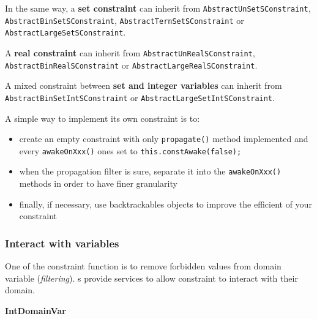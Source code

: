 In the same way, a \textbf{set constraint} can inherit from \texttt{AbstractUnSetSConstraint}, \texttt{AbstractBinSetSConstraint}, \texttt{AbstractTernSetSConstraint} or \texttt{AbstractLargeSetSConstraint}.

A \textbf{real constraint} can inherit from \texttt{AbstractUnRealSConstraint}, \texttt{AbstractBinRealSConstraint} or \texttt{AbstractLargeRealSConstraint}.

A mixed constraint between \textbf{set and integer variables} can inherit from \texttt{AbstractBinSetIntSConstraint} or \texttt{AbstractLargeSetIntSConstraint}.

\begin{note}
A simple way to implement its own constraint is to:
\begin{itemize}
	\item create an empty constraint with only \texttt{propagate()} method implemented and every \texttt{awakeOnXxx()} ones set to \texttt{this.constAwake(false);}
	\item when the propagation filter is sure, separate it into the \texttt{awakeOnXxx()} methods in order to have finer granularity
	\item finally, if necessary, use backtrackables objects to improve the efficient of your constraint
\end{itemize}

\end{note}

\subsubsection{Interact with variables}\label{advanced:interactwithvariables}\hypertarget{advanced:interactwithvariables}{}

One of the constraint function is to remove forbidden values from domain variable (\textit{filtering}). s provide services to allow constraint to interact with their domain.

\vspace{0.5cm}
\textbf{IntDomainVar}

